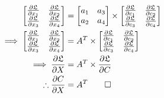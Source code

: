 \begin{align*}
\begin{bmatrix}
\frac{\partial \mathfrak{L}}{\partial x_1} & \frac{\partial \mathfrak{L}}{\partial x_2} \\
\frac{\partial \mathfrak{L}}{\partial x_3} & \frac{\partial \mathfrak{L}}{\partial x_4}
\end{bmatrix} &= \begin{bmatrix}
a_1 & a_3 \\
a_2 & a_4
\end{bmatrix} \times \begin{bmatrix}
\frac{\partial \mathfrak{L}}{\partial c_1} & \frac{\partial \mathfrak{L}}{\partial c_2} \\
\frac{\partial \mathfrak{L}}{\partial c_3} & \frac{\partial \mathfrak{L}}{\partial c_4}
\end{bmatrix}\\
\implies \begin{bmatrix}
\frac{\partial \mathfrak{L}}{\partial x_1} & \frac{\partial \mathfrak{L}}{\partial x_2} \\
\frac{\partial \mathfrak{L}}{\partial x_3} & \frac{\partial \mathfrak{L}}{\partial x_4}
\end{bmatrix} &= A^T \times \begin{bmatrix}
\frac{\partial \mathfrak{L}}{\partial c_1} & \frac{\partial \mathfrak{L}}{\partial c_2} \\
\frac{\partial \mathfrak{L}}{\partial c_3} & \frac{\partial \mathfrak{L}}{\partial c_4}
\end{bmatrix}\\
\implies \frac{\partial \mathfrak{L}}{\partial X} &= A^T \times \frac{\partial \mathfrak{L}}{\partial C}\\
\therefore \frac{\partial C}{\partial X} &= A^T \qed
\end{align*}
